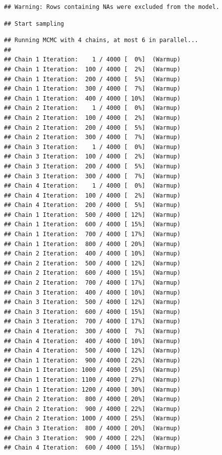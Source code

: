 \documentclass[
]{article}
\begin{document}
\begin{verbatim}
## Warning: Rows containing NAs were excluded from the model.
\end{verbatim}

\begin{verbatim}
## Start sampling
\end{verbatim}

\begin{verbatim}
## Running MCMC with 4 chains, at most 6 in parallel...
## 
## Chain 1 Iteration:    1 / 4000 [  0%]  (Warmup) 
## Chain 1 Iteration:  100 / 4000 [  2%]  (Warmup) 
## Chain 1 Iteration:  200 / 4000 [  5%]  (Warmup) 
## Chain 1 Iteration:  300 / 4000 [  7%]  (Warmup) 
## Chain 1 Iteration:  400 / 4000 [ 10%]  (Warmup) 
## Chain 2 Iteration:    1 / 4000 [  0%]  (Warmup) 
## Chain 2 Iteration:  100 / 4000 [  2%]  (Warmup) 
## Chain 2 Iteration:  200 / 4000 [  5%]  (Warmup) 
## Chain 2 Iteration:  300 / 4000 [  7%]  (Warmup) 
## Chain 3 Iteration:    1 / 4000 [  0%]  (Warmup) 
## Chain 3 Iteration:  100 / 4000 [  2%]  (Warmup) 
## Chain 3 Iteration:  200 / 4000 [  5%]  (Warmup) 
## Chain 3 Iteration:  300 / 4000 [  7%]  (Warmup) 
## Chain 4 Iteration:    1 / 4000 [  0%]  (Warmup) 
## Chain 4 Iteration:  100 / 4000 [  2%]  (Warmup) 
## Chain 4 Iteration:  200 / 4000 [  5%]  (Warmup) 
## Chain 1 Iteration:  500 / 4000 [ 12%]  (Warmup) 
## Chain 1 Iteration:  600 / 4000 [ 15%]  (Warmup) 
## Chain 1 Iteration:  700 / 4000 [ 17%]  (Warmup) 
## Chain 1 Iteration:  800 / 4000 [ 20%]  (Warmup) 
## Chain 2 Iteration:  400 / 4000 [ 10%]  (Warmup) 
## Chain 2 Iteration:  500 / 4000 [ 12%]  (Warmup) 
## Chain 2 Iteration:  600 / 4000 [ 15%]  (Warmup) 
## Chain 2 Iteration:  700 / 4000 [ 17%]  (Warmup) 
## Chain 3 Iteration:  400 / 4000 [ 10%]  (Warmup) 
## Chain 3 Iteration:  500 / 4000 [ 12%]  (Warmup) 
## Chain 3 Iteration:  600 / 4000 [ 15%]  (Warmup) 
## Chain 3 Iteration:  700 / 4000 [ 17%]  (Warmup) 
## Chain 4 Iteration:  300 / 4000 [  7%]  (Warmup) 
## Chain 4 Iteration:  400 / 4000 [ 10%]  (Warmup) 
## Chain 4 Iteration:  500 / 4000 [ 12%]  (Warmup) 
## Chain 1 Iteration:  900 / 4000 [ 22%]  (Warmup) 
## Chain 1 Iteration: 1000 / 4000 [ 25%]  (Warmup) 
## Chain 1 Iteration: 1100 / 4000 [ 27%]  (Warmup) 
## Chain 1 Iteration: 1200 / 4000 [ 30%]  (Warmup) 
## Chain 2 Iteration:  800 / 4000 [ 20%]  (Warmup) 
## Chain 2 Iteration:  900 / 4000 [ 22%]  (Warmup) 
## Chain 2 Iteration: 1000 / 4000 [ 25%]  (Warmup) 
## Chain 3 Iteration:  800 / 4000 [ 20%]  (Warmup) 
## Chain 3 Iteration:  900 / 4000 [ 22%]  (Warmup) 
## Chain 4 Iteration:  600 / 4000 [ 15%]  (Warmup) 

\end{verbatim}
\end{document}
